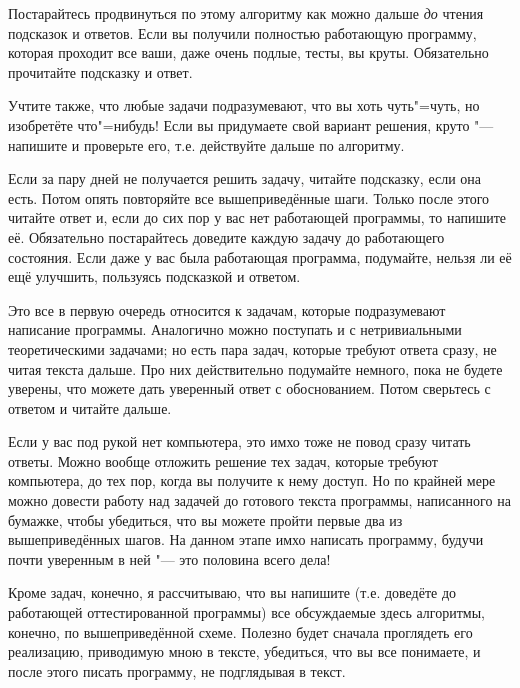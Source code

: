 Постарайтесь продвинуться по этому алгоритму как можно дальше \textit{до} чтения подсказок и ответов. Если вы получили
полностью работающую программу, которая проходит все ваши, даже очень подлые, тесты, вы круты. Обязательно прочитайте 
подсказку и ответ. 

Учтите также, что любые задачи
подразумевают, что вы хоть чуть"=чуть, но изобретёте что"=нибудь! Если вы 
придумаете свой вариант решения, круто "--- напишите и проверьте его, т.е. действуйте дальше по алгоритму.

Если за пару дней не получается решить задачу, читайте подсказку, если она есть. Потом опять повторяйте все вышеприведённые
шаги. Только после этого читайте ответ и, если до сих пор у вас нет работающей программы, то напишите её. Обязательно постарайтесь
доведите каждую задачу до работающего состояния. Если даже у вас
была работающая программа, подумайте, нельзя ли её ещё улучшить, пользуясь подсказкой и ответом. 

Это все в первую очередь относится к задачам, которые подразумевают написание программы. Аналогично можно поступать и
с нетривиальными теоретическими задачами; но есть пара задач, которые требуют ответа сразу, не читая текста дальше.
Про них действительно подумайте немного, пока не будете уверены, что можете дать уверенный ответ с обоснованием. Потом
сверьтесь с ответом и читайте дальше.

Если у вас под рукой нет компьютера, это имхо тоже не повод сразу читать ответы. Можно вообще отложить решение тех задач,
которые требуют компьютера, до тех пор, когда вы получите к нему доступ. Но по крайней мере можно
довести работу над задачей до готового текста программы, написанного на бумажке, чтобы убедиться, что вы можете пройти
первые два из вышеприведённых шагов. На данном этапе имхо написать программу, будучи почти уверенным в ней "--- это половина
всего дела!

Кроме задач, конечно, я рассчитываю, что вы напишите (т.е. доведёте до работающей оттестированной программы) все 
обсуждаемые здесь алгоритмы, конечно, по вышеприведённой схеме. Полезно будет сначала проглядеть его 
реализацию, приводимую мною в тексте, убедиться, что вы все понимаете, и после этого писать программу, не подглядывая
 в текст.
